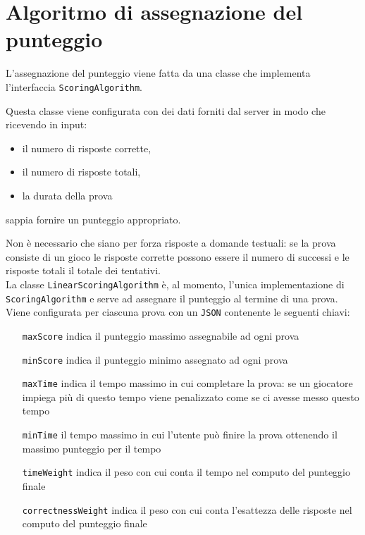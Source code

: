 \section{Algoritmo di assegnazione del punteggio}
\label{sec:Algoritmo di assegnazione del punteggio}

L'assegnazione del punteggio viene fatta da una classe che implementa l'interfaccia \texttt{ScoringAlgorithm}.

Questa classe viene configurata con dei dati forniti dal server in modo che ricevendo in input:
\begin{itemize}
   \item il numero di risposte corrette,
   \item il numero di risposte totali,
   \item la durata della prova
\end{itemize}
sappia fornire un punteggio appropriato.

Non è necessario che siano per forza risposte a domande testuali: se la prova consiste di un gioco le risposte corrette possono essere il numero di successi e le risposte totali il totale dei tentativi. \\

La classe \texttt{LinearScoringAlgorithm} è, al momento, l'unica implementazione di \texttt{ScoringAlgorithm} e serve ad assegnare il punteggio al termine di una prova. Viene configurata per ciascuna prova con un \texttt{JSON} contenente le seguenti chiavi:
\begin{itemize}
   \item[\texttt{maxScore}] indica il punteggio massimo assegnabile ad ogni prova
   \item[\texttt{minScore}] indica il punteggio minimo assegnato ad ogni prova
   \item[\texttt{maxTime}] indica il tempo massimo in cui completare la prova: se un giocatore impiega più di questo tempo viene penalizzato come se ci avesse messo questo tempo
   \item[\texttt{minTime}] il tempo massimo in cui l'utente può finire la prova ottenendo il massimo punteggio per il tempo
   \item[\texttt{timeWeight}] indica il peso con cui conta il tempo nel computo del punteggio finale
   \item[\texttt{correctnessWeight}] indica il peso con cui conta l'esattezza delle risposte nel computo del punteggio finale
\end{itemize}

